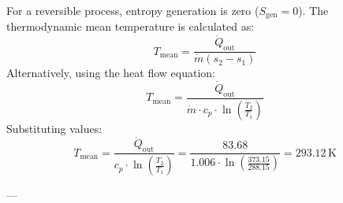 For a reversible process, entropy generation is zero (\( S_{\text{gen}} = 0 \)). The thermodynamic mean temperature is calculated as:  
\[
T_{\text{mean}} = \frac{\dot{Q}_{\text{out}}}{\dot{m} (s_2 - s_1)}  
\]  
Alternatively, using the heat flow equation:  
\[
T_{\text{mean}} = \frac{\dot{Q}_{\text{out}}}{\dot{m} \cdot c_p \cdot \ln\left(\frac{T_2}{T_1}\right)}  
\]  
Substituting values:  
\[
T_{\text{mean}} = \frac{\dot{Q}_{\text{out}}}{c_p \cdot \ln\left(\frac{T_2}{T_1}\right)} = \frac{83.68}{1.006 \cdot \ln\left(\frac{373.15}{288.15}\right)} = 293.12 \, \text{K}
\]  

---